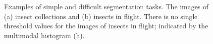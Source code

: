 \begin{figure}[!htbp]
 \
\\
 \
\\
\caption[Simple and difficult segmentation tasks.]{Examples of simple and difficult segmentation tasks. The images of (a) insect collections and (b) insects in flight. There is no single threshold values for the images of insects in flight; indicated by the multimodal histogram (h).}\label{fig:seg-binary}
\end{figure}

